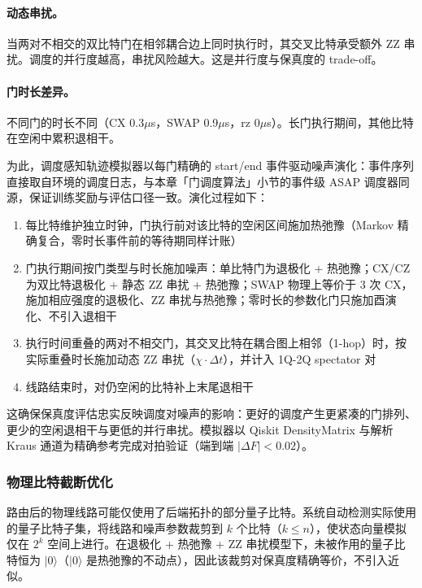 \paragraph{动态串扰。} 当两对不相交的双比特门在相邻耦合边上同时执行时，其交叉比特承受额外 ZZ 串扰。调度的并行度越高，串扰风险越大。这是并行度与保真度的 trade-off。

\paragraph{门时长差异。} 不同门的时长不同（CX 0.3$\mu$s，SWAP 0.9$\mu$s，rz 0$\mu$s）。长门执行期间，其他比特在空闲中累积退相干。

为此，调度感知轨迹模拟器以每门精确的 start/end 事件驱动噪声演化：事件序列直接取自环境的调度日志，与本章「门调度算法」小节的事件级 ASAP 调度器同源，保证训练奖励与评估口径一致。演化过程如下：

\begin{enumerate}
  \item 每比特维护独立时钟，门执行前对该比特的空闲区间施加热弛豫（Markov 精确复合，零时长事件前的等待期同样计账）
  \item 门执行期间按门类型与时长施加噪声：单比特门为退极化 + 热弛豫；CX/CZ 为双比特退极化 + 静态 ZZ 串扰 + 热弛豫；SWAP 物理上等价于 3 次 CX，施加相应强度的退极化、ZZ 串扰与热弛豫；零时长的参数化门只施加酉演化、不引入退相干
  \item 执行时间重叠的两对不相交门，其交叉比特在耦合图上相邻（1-hop）时，按实际重叠时长施加动态 ZZ 串扰（$\chi \cdot \Delta t$），并计入 1Q-2Q spectator 对
  \item 线路结束时，对仍空闲的比特补上末尾退相干
\end{enumerate}

这确保保真度评估忠实反映调度对噪声的影响：更好的调度产生更紧凑的门排列、更少的空闲退相干与更低的并行串扰。模拟器以 Qiskit DensityMatrix 与解析 Kraus 通道为精确参考完成对拍验证（端到端 $|\Delta F| < 0.02$）。

\subsubsection{物理比特截断优化}

路由后的物理线路可能仅使用了后端拓扑的部分量子比特。系统自动检测实际使用的量子比特子集，将线路和噪声参数裁剪到 $k$ 个比特（$k \leq n$），使状态向量模拟仅在 $2^k$ 空间上进行。在退极化 + 热弛豫 + ZZ 串扰模型下，未被作用的量子比特恒为 $|0\rangle$（$|0\rangle$ 是热弛豫的不动点），因此该裁剪对保真度精确等价，不引入近似。

